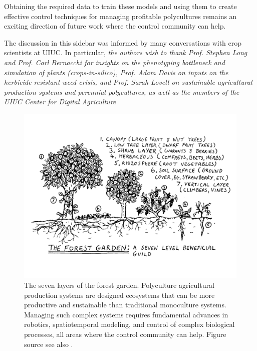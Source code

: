  Obtaining the required data to train these models and using them to create effective control techniques for managing profitable polycultures remains an exciting direction of future work where the control community can help.
 
 The discussion in this sidebar was informed by many conversations with  crop scientists at UIUC. In particular, 
\textit{the authors wish to thank Prof. Stephen Long and Prof. Carl Bernacchi for insights on the phenotyping bottleneck and simulation of plants (\textit{crops-in-silico}), Prof. Adam Davis on inputs on the herbicide resistant weed crisis, and Prof. Sarah Lovell on sustainable agricultural production systems and perennial polycultures, as well as the members of the UIUC Center for Digital Agriculture} 

\begin{figure}[tbh]
\includegraphics[width=\textwidth]{./figures/polyculture}
\caption{The seven layers of the forest garden. Polyculture agricultural production systems are designed ecosystems that can be more productive and sustainable than traditional monoculture systems. Managing such complex systems requires fundamental advances in robotics, spatiotemporal modeling, and control of complex biological processes, all areas where the control community can help. Figure source \cite{polyculture_fig}  see also \cite{rhodes2012feeding}.}
\label{fig:polycultures}
\end{figure}


